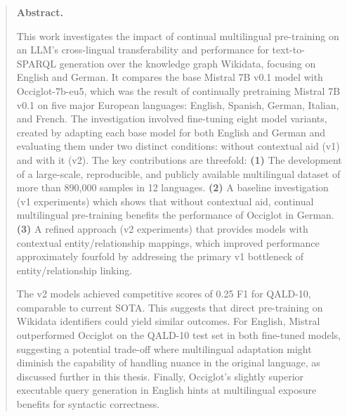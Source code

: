 \documentclass[
	a4paper,
	pagesize,
	pdftex,
	12pt,
	ngerman,
	fleqn,
	final,
	]{scrartcl}
\begin{document}
\makeatletter
\renewcommand*{\@titelEinreichungsdatum}{28.06.2025}
\makeatother
\makeTitel

\begin{abstract}
\textbf{Abstract.}

This work investigates the impact of continual multilingual pre-training on an LLM's cross-lingual transferability and performance for text-to-SPARQL generation over the knowledge graph Wikidata, focusing on English and German. 
It compares the base Mistral 7B v0.1 model with Occiglot-7b-eu5, which was the result of continually pretraining Mistral 7B v0.1 on five major European languages: English, Spanish, German, Italian, and French.
The investigation involved fine-tuning eight model variants, created by adapting each base model for both English and German and evaluating them under two distinct conditions: without contextual aid (v1) and with it (v2).
The key contributions are threefold: \textbf{(1)} The development of a large-scale, reproducible, and publicly available multilingual dataset of more than 890,000 samples in 12 languages. \textbf{(2)} A baseline investigation (v1 experiments) which shows that without contextual aid, continual multilingual pre-training benefits the performance of Occiglot in German. \textbf{(3)} A refined approach (v2 experiments) that provides models with contextual entity/relationship mappings, which improved performance approximately fourfold by addressing the primary v1 bottleneck of entity/relationship linking.

The v2 models achieved competitive scores of 0.25 F1 for QALD-10, comparable to current SOTA. This suggests that direct pre-training on Wikidata identifiers could yield similar outcomes. 
For English, Mistral outperformed Occiglot on the QALD-10 test set in both fine-tuned models, suggesting a potential trade-off where multilingual adaptation might diminish the capability of handling nuance in the original language, as discussed further in this thesis.
Finally, Occiglot's slightly superior executable query generation in English hints at multilingual exposure benefits for syntactic correctness.

\end{abstract}
\newpage
\end{document}
